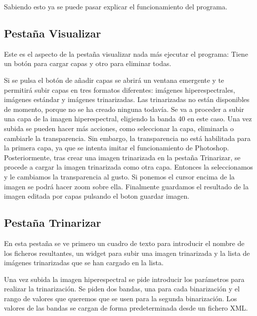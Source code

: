Sabiendo esto ya se puede pasar explicar el funcionamiento del programa.

\subsection{Pestaña Visualizar}
Este es el aspecto de la pestaña visualizar nada más ejecutar el programa:
Tiene un botón para cargar capas y otro para eliminar todas. 

Si se pulsa el botón de añadir capas se abrirá un ventana emergente y te permitirá subir capas en tres formatos diferentes: imágenes hiperespectrales, imágenes estándar y imágenes trinarizadas. Las trinarizadas no están disponibles de momento, porque no se ha creado ninguna todavía.
Se va a proceder a subir una capa de la imagen hiperespectral, eligiendo la banda 40 en este caso.
Una vez subida se pueden hacer más acciones, como seleccionar la capa, eliminarla o cambiarle la transparencia. Sin embargo, la transparencia no está habilitada para la primera capa, ya que se intenta imitar el funcionamiento de Photoshop.
Posteriormente, tras crear una imagen trinarizada en la pestaña Trinarizar, se procede a cargar la imagen trinarizada como otra capa. Entonces la seleccionamos y le cambiamos la transparencia al gusto. Si ponemos el cursor encima de la imagen se podrá hacer zoom sobre ella.
Finalmente guardamos el resultado de la imagen editada por capas pulsando el boton guardar imagen.


\subsection{Pestaña Trinarizar}
En esta pestaña se ve primero un cuadro de texto para introducir el nombre de los ficheros resultantes, un widget para subir una imagen trinarizada y la lista de imágenes trinarizadas que se han cargado en la lista.


Una vez subida la imagen hiperespectral se pide introducir los parámetros para realizar la trinarización. Se piden dos bandas, una para cada binarización y el rango de valores que queremos que se usen para la segunda binarización.
Los valores de las bandas se cargan de forma predeterminada desde un fichero XML. 

